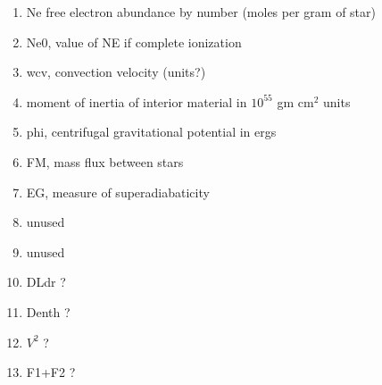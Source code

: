 \documentclass{article}
\begin{document}
\begin{description}
\begin{enumerate}
					\item	Ne  free electron abundance by number (moles per gram of star)
					\item	Ne0,  value of NE if complete ionization
					\item	wcv, convection velocity   (units?)
					\item	moment of inertia of interior material in $10^{55}$ gm cm$^2$ units
					\item	phi,  centrifugal gravitational potential in ergs
					\item	FM, mass flux between stars
					\item	EG, measure of superadiabaticity
					\item	unused
					\item	unused
					\item	DLdr  ?
					\item	Denth  ?
					\item	$V^2$  ?
					\item	F1+F2  ?
	\end{enumerate}
	
\end{description}
\end{document}
